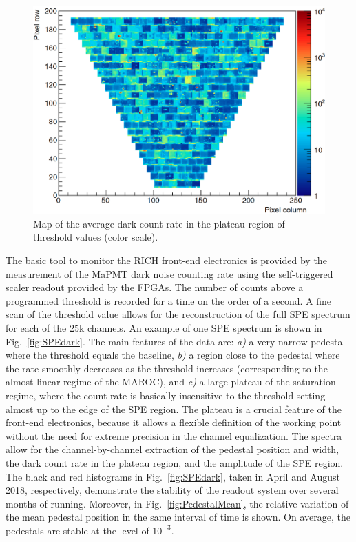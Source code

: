 \documentclass[5p,times,twocolumn]{elsarticle}
\begin{document}
\begin{figure}[t]
\begin{center}
\includegraphics[width=1.0\columnwidth]{Darkcount_map.png}
\end{center}
\caption{Map of the average dark count rate in the plateau region of threshold values (color scale).}
\label{fig:DarkCountMap}
\end{figure}


The basic tool to monitor the RICH front-end electronics is provided by the measurement of the MaPMT dark noise
counting rate using the self-triggered scaler readout provided by the FPGAs. The number of counts above a programmed
threshold is recorded for a time on the order of a second. A fine scan of the threshold value allows for the
reconstruction of the full SPE spectrum for each of the 25k channels. An example of one SPE spectrum is shown in
Fig.~\ref{fig:SPEdark}. The main features of the data are: {\it{a)}} a very narrow pedestal where the threshold equals
the baseline,  {\it{b)}} a region close to the pedestal where the rate smoothly decreases as the threshold increases
(corresponding to the almost linear regime of the MAROC), and  {\it{c)}} a large plateau of the saturation regime, where
the count rate is basically insensitive to the threshold setting almost up to the edge of the SPE region. The plateau is a
crucial feature of the front-end electronics, because it allows a flexible definition of the working point without the need
for extreme precision in the channel equalization. The spectra allow for the channel-by-channel extraction of the 
pedestal position and width, the dark count rate in the plateau region, and the amplitude of the SPE region. The black
and red histograms in Fig.~\ref{fig:SPEdark}, taken in April and August 2018, respectively, demonstrate the stability
of the readout system over several months of running. Moreover, in Fig.~\ref{fig:PedestalMean}, the relative variation
of the mean pedestal position in the same interval of time is shown. On average, the pedestals are stable at the level of
$10^{-3}$.
\end{document}
